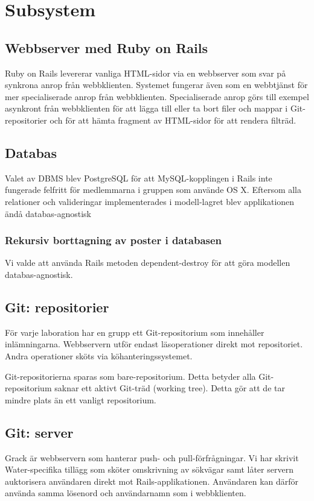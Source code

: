 \section{Subsystem}
\subsection{Webbserver med Ruby on Rails}
Ruby on Rails levererar vanliga HTML-sidor via en webbserver som svar på synkrona anrop från webbklienten. Systemet fungerar även som en webbtjänst för mer specialiserade anrop från webbklienten. Specialiserade anrop görs till exempel asynkront från webbklienten för att lägga till eller ta bort filer och mappar i Git-repositorier och för att hämta fragment av HTML-sidor för att rendera filträd.
\subsection{Databas}
Valet av DBMS blev PostgreSQL för att MySQL-kopplingen i Rails inte fungerade felfritt för medlemmarna i gruppen som använde OS X. Eftersom alla relationer och valideringar implementerades i modell-lagret blev applikationen ändå databas-agnostisk
\subsubsection{Rekursiv borttagning av poster i databasen}
Vi valde att använda Rails metoden dependent-destroy för att göra modellen databas-agnostisk.
\subsection{Git: repositorier}
För varje laboration har en grupp ett Git-repositorium som innehåller inlämningarna. Webbservern utför endast läsoperationer direkt mot repositoriet. Andra operationer sköts via köhanteringssystemet.

Git-repositorierna sparas som bare-repositorium. Detta betyder alla Git-repositorium saknar ett aktivt Git-träd (working tree). Detta gör att de tar mindre plats än ett vanligt repositorium.
\subsection{Git: server}
Grack är webbservern som hanterar push- och pull-förfrågningar. Vi har skrivit Water-specifika tillägg som sköter omskrivning av sökvägar samt låter servern auktorisera användaren direkt mot Rails-applikationen. Användaren kan därför använda samma lösenord och användarnamn som i webbklienten.

